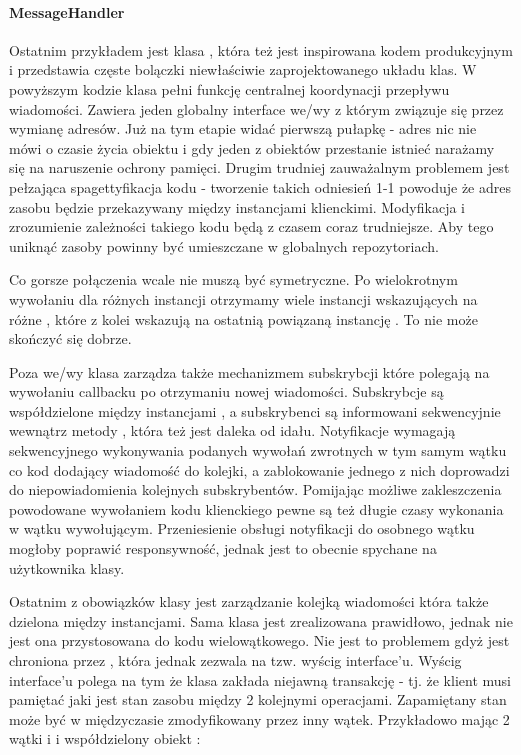 \paragraph{MessageHandler}
Ostatnim przykładem jest klasa , która też jest inspirowana kodem produkcyjnym i przedstawia częste bolączki niewłaściwie zaprojektowanego układu klas.
W powyższym kodzie klasa  pełni funkcję centralnej koordynacji przepływu wiadomości. Zawiera jeden globalny interface we/wy  z którym związuje się przez wymianę adresów. Już na tym etapie widać pierwszą pułapkę - adres nic nie mówi o czasie życia obiektu i gdy jeden z obiektów przestanie istnieć narażamy się na naruszenie ochrony pamięci. Drugim trudniej zauważalnym problemem jest pełzająca spagettyfikacja kodu - tworzenie takich odniesień 1-1 powoduje że adres zasobu będzie przekazywany między instancjami klienckimi. Modyfikacja i zrozumienie zależności takiego kodu będą z czasem coraz trudniejsze. Aby tego uniknąć zasoby powinny być umieszczane w globalnych repozytoriach.

Co gorsze połączenia wcale nie muszą być symetryczne. Po wielokrotnym wywołaniu  dla różnych instancji  otrzymamy wiele instancji  wskazujących na różne , które z kolei wskazują na ostatnią powiązaną instancję . To nie może skończyć się dobrze.

Poza we/wy klasa  zarządza także mechanizmem subskrybcji które polegają na wywołaniu callbacku po otrzymaniu nowej wiadomości. Subskrybcje są współdzielone między instancjami , a subskrybenci są informowani sekwencyjnie wewnątrz metody , która też jest daleka od idału. Notyfikacje wymagają sekwencyjnego wykonywania podanych wywołań zwrotnych w tym samym wątku co kod dodający wiadomość do kolejki, a zablokowanie jednego z nich doprowadzi do niepowiadomienia kolejnych subskrybentów. Pomijając możliwe zakleszczenia powodowane wywołaniem kodu klienckiego pewne są też długie czasy wykonania w wątku wywołującym. Przeniesienie obsługi notyfikacji do osobnego wątku mogłoby poprawić responsywność, jednak jest to obecnie spychane na użytkownika klasy.

Ostatnim z obowiązków klasy  jest zarządzanie kolejką wiadomości która także dzielona między instancjami. Sama klasa  jest zrealizowana prawidłowo, jednak nie jest ona przystosowana do kodu wielowątkowego. Nie jest to problemem gdyż jest chroniona przez , która jednak zezwala na tzw. wyścig interface'u. Wyścig interface'u polega na tym że klasa zakłada niejawną transakcję - tj. że klient musi pamiętać jaki jest stan zasobu między 2 kolejnymi operacjami. Zapamiętany stan może być w międzyczasie zmodyfikowany przez inny wątek. Przykładowo mając 2 wątki  i  i współdzielony obiekt :

